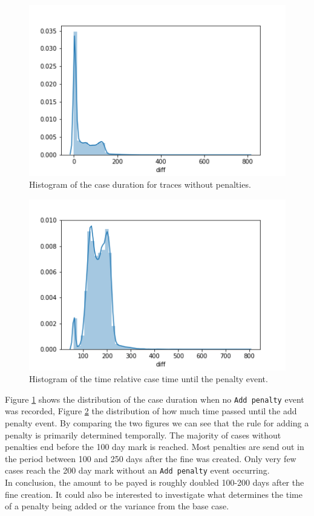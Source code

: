 \documentclass[12pt]{report}
\begin{document}
\begin{figure}[H]
  \centering
  \includegraphics[width=\textwidth]{figures/dlz_no_penalty.png}
  \caption{Histogram of the case duration for traces without penalties.}
  \label{fig:dlz_no_penalty}
\end{figure}

\begin{figure}[H]
  \centering
  \includegraphics[width=\textwidth]{figures/time2penalty.png}
  \caption{Histogram of the time relative case time until the penalty event.}
  \label{fig:time2penalty}
\end{figure}

Figure \ref{fig:dlz_no_penalty} shows the distribution of the case duration when no \texttt{Add penalty} event was recorded, Figure \ref{fig:time2penalty} the distribution of how much time passed until the add penalty event. By comparing the two figures we can see that the rule for adding a penalty is primarily determined temporally. The majority of cases without penalties end before the 100 day mark is reached. Most penalties are send out in the period between 100 and 250 days after the fine was created. Only very few cases reach the 200 day mark without an \texttt{Add penalty} event occurring. \\
In conclusion, the amount to be payed is roughly doubled 100-200 days after the fine creation. It could also be interested to investigate what determines the time of a penalty being added or the variance from the base case.
\end{document}
